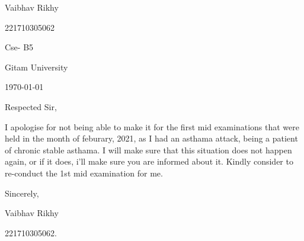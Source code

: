 \documentclass{article}
\begin{document}
\hspace*{0.9\linewidth}
\begin{minipage}{0.4\linewidth}
Vaibhav Rikhy\par
221710305062\par
Cse- B5\par
Gitam University\par
\today
\end{minipage}
\vspace{10mm}

Respected Sir,  \par \bigskip

I apologise for not being able to make it for the first mid examinations that were held in the month of feburary, 2021, as I had an asthama attack, being a patient of chronic stable asthama. I will make sure that this situation does not happen again, or if it does, i'll make sure you are informed about it. Kindly consider to re-conduct the 1st mid examination for me. \par \bigskip

Sincerely, \par \smallskip


Vaibhav Rikhy\par
221710305062.
\end{document}
